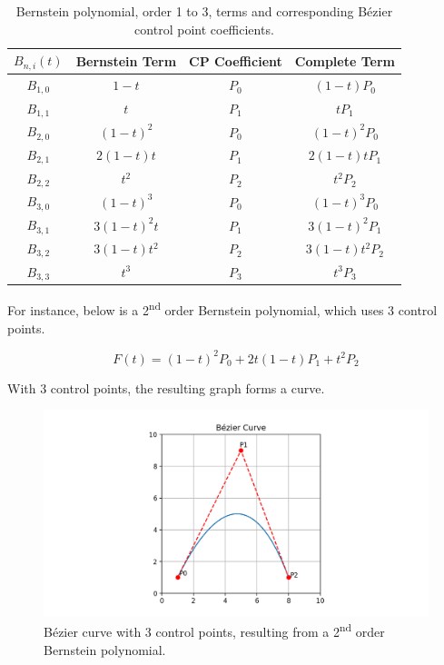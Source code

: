 \documentclass[12pt,letterpaper]{article}
\begin{document}
\begin{table}[H]
    \centering
    \begin{tabular}{ | c | c c | c | }
        \hline
        $B_{n,i} (t)$ & Bernstein Term & CP Coefficient & Complete Term \\
        \hline
        $B_{1,0}$ & $1-t$ 		& $P_0$ & $(1-t)P_0$ 	    \\
        \hline
        $B_{1,1}$ & $t$ 		& $P_1$ & $tP_1$ 		    \\
        \hline
        $B_{2,0}$ & $(1-t)^2$ 	& $P_0$ & $(1-t)^2P_0$ 	    \\
        \hline
        $B_{2,1}$ & $2(1-t)t$ 	& $P_1$ & $2(1-t)tP_1$ 	    \\
        \hline
        $B_{2,2}$ & $t^2$ 		& $P_2$ & $t^2P_2$ 	        \\
        \hline
        $B_{3,0}$ & $(1-t)^3$ 	& $P_0$ & $(1-t)^3P_0$ 	    \\
        \hline
        $B_{3,1}$ & $3(1-t)^2t$ 	& $P_1$ & $3(1-t)^2P_1$	\\
        \hline
        $B_{3,2}$ & $3(1-t)t^2$ 	& $P_2$ & $3(1-t)t^2P_2$\\
        \hline
        $B_{3,3}$ & $t^3$ 		& $P_3$ & $t^3P_3$ 	        \\
        \hline
    \end{tabular}
    \caption{Bernstein polynomial, order 1 to 3, terms and corresponding B\'ezier control point coefficients.}
    \label{tab:coeffs}
\end{table}

For instance, below is a 2\textsuperscript{nd} order Bernstein polynomial, which uses 3 control points.

$$F(t)= (1-t)^2 P_0+2t(1-t) P_1+t^2 P_2$$

With 3 control points, the resulting graph forms a curve.

\begin{figure}[H]
    \includegraphics[width=15cm]{Figure_4}
    \centering
    \caption{B\'ezier curve with 3 control points, resulting from a 2\textsuperscript{nd} order Bernstein polynomial.}
    \label{fig:bez3}
\end{figure}
\end{document}
